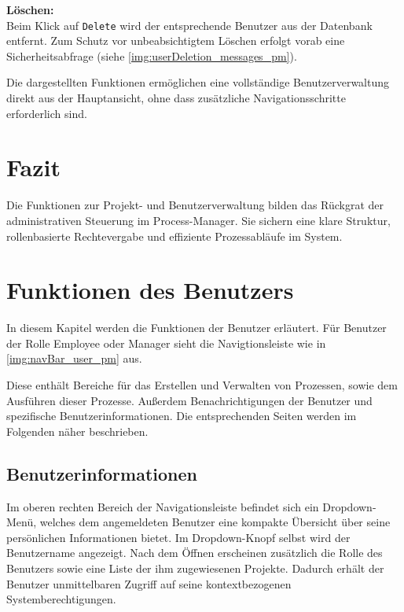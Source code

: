 
\newpage
\textbf{Löschen:}\\
Beim Klick auf \texttt{Delete} wird der entsprechende Benutzer aus der Datenbank entfernt. Zum Schutz vor unbeabsichtigtem Löschen erfolgt vorab eine Sicherheitsabfrage (siehe \autoref{img:userDeletion_messages_pm}).

Die dargestellten Funktionen ermöglichen eine vollständige Benutzerverwaltung direkt aus der Hauptansicht, ohne dass zusätzliche Navigationsschritte erforderlich sind.

\section*{Fazit}
Die Funktionen zur Projekt- und Benutzerverwaltung bilden das Rückgrat der administrativen Steuerung im Process-Manager. Sie sichern eine klare Struktur, rollenbasierte Rechtevergabe und effiziente Prozessabläufe im System.


\newpage
\section{Funktionen des Benutzers} \label{functions_user}
In diesem Kapitel werden die Funktionen der Benutzer erläutert. Für Benutzer der Rolle \glqq Employee\grqq{} oder \glqq Manager\grqq{} sieht die Navigtionsleiste wie in \autoref{img:navBar_user_pm} aus. 


Diese enthält Bereiche für das Erstellen und Verwalten von Prozessen, sowie dem Ausführen dieser Prozesse. Außerdem Benachrichtigungen der Benutzer und spezifische Benutzerinformationen. Die entsprechenden Seiten werden im Folgenden näher beschrieben.


\subsection{Benutzerinformationen}
Im oberen rechten Bereich der Navigationsleiste befindet sich ein Dropdown-Menü, welches dem angemeldeten Benutzer eine kompakte Übersicht über seine persönlichen Informationen bietet. Im Dropdown-Knopf selbst wird der Benutzername angezeigt. Nach dem Öffnen erscheinen zusätzlich die Rolle des Benutzers sowie eine Liste der ihm zugewiesenen Projekte. Dadurch erhält der Benutzer unmittelbaren Zugriff auf seine kontextbezogenen Systemberechtigungen.


